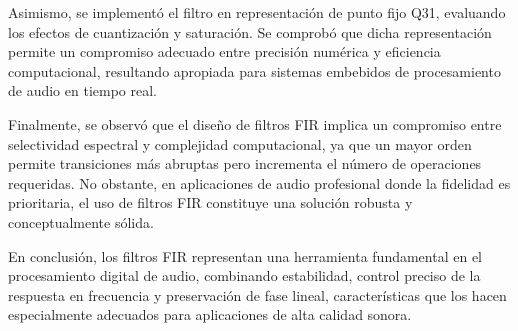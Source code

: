 \documentclass[a4,11pt]{article}
\begin{document}
Asimismo, se implementó el filtro en representación de punto fijo Q31, evaluando los efectos de cuantización y saturación. Se comprobó que dicha representación permite un compromiso adecuado entre precisión numérica y eficiencia computacional, resultando apropiada para sistemas embebidos de procesamiento de audio en tiempo real.

Finalmente, se observó que el diseño de filtros FIR implica un compromiso entre selectividad espectral y complejidad computacional, ya que un mayor orden permite transiciones más abruptas pero incrementa el número de operaciones requeridas. No obstante, en aplicaciones de audio profesional donde la fidelidad es prioritaria, el uso de filtros FIR constituye una solución robusta y conceptualmente sólida.

En conclusión, los filtros FIR representan una herramienta fundamental en el procesamiento digital de audio, combinando estabilidad, control preciso de la respuesta en frecuencia y preservación de fase lineal, características que los hacen especialmente adecuados para aplicaciones de alta calidad sonora.


\nocite{*}


\listoffigures
\end{document}
